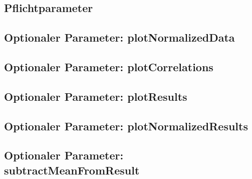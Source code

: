 \documentclass[a4paper, 12pt, oneside]{scrbook}
\begin{document}
\subsection{Pflichtparameter}
\subsection{Optionaler Parameter: plotNormalizedData}
\subsection{Optionaler Parameter: plotCorrelations}
\subsection{Optionaler Parameter: plotResults}
\subsection{Optionaler Parameter: plotNormalizedResults}
\subsection{Optionaler Parameter: subtractMeanFromResult}
\end{document}
